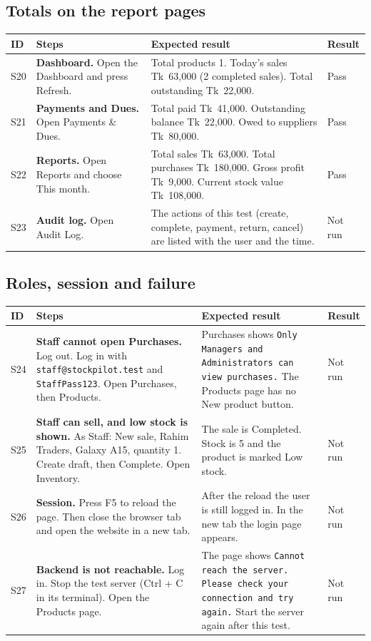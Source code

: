 \documentclass[11pt,a4paper]{article}
\newcommand{\code}[1]{\texttt{#1}}
\begin{document}
\subsection{Totals on the report pages}
\begin{longtable}{@{}P{0.75cm}P{6.0cm}P{5.3cm}P{1.3cm}@{}}
\toprule
\textbf{ID} & \textbf{Steps} & \textbf{Expected result} & \textbf{Result} \\
\midrule
\endhead
S20 & \textbf{Dashboard.} Open the Dashboard and press Refresh. & Total products 1. Today's sales Tk~63,000 (2 completed sales). Total outstanding Tk~22,000. & Pass \\\addlinespace
S21 & \textbf{Payments and Dues.} Open Payments \& Dues. & Total paid Tk~41,000. Outstanding balance Tk~22,000. Owed to suppliers Tk~80,000. & Pass \\\addlinespace
S22 & \textbf{Reports.} Open Reports and choose This month. & Total sales Tk~63,000. Total purchases Tk~180,000. Gross profit Tk~9,000. Current stock value Tk~108,000. & Pass \\\addlinespace
S23 & \textbf{Audit log.} Open Audit Log. & The actions of this test (create, complete, payment, return, cancel) are listed with the user and the time. & Not run \\*
\bottomrule
\end{longtable}

\subsection{Roles, session and failure}
\begin{longtable}{@{}P{0.75cm}P{6.0cm}P{5.3cm}P{1.3cm}@{}}
\toprule
\textbf{ID} & \textbf{Steps} & \textbf{Expected result} & \textbf{Result} \\
\midrule
\endhead
S24 & \textbf{Staff cannot open Purchases.} Log out. Log in with \code{staff@stockpilot.test} and \code{StaffPass123}. Open Purchases, then Products. & Purchases shows \code{Only Managers and Administrators can view purchases.} The Products page has no New product button. & Not run \\\addlinespace
S25 & \textbf{Staff can sell, and low stock is shown.} As Staff: New sale, Rahim Traders, Galaxy A15, quantity 1. Create draft, then Complete. Open Inventory. & The sale is Completed. Stock is 5 and the product is marked Low stock. & Not run \\\addlinespace
S26 & \textbf{Session.} Press F5 to reload the page. Then close the browser tab and open the website in a new tab. & After the reload the user is still logged in. In the new tab the login page appears. & Not run \\\addlinespace
S27 & \textbf{Backend is not reachable.} Log in. Stop the test server (Ctrl + C in its terminal). Open the Products page. & The page shows \code{Cannot reach the server. Please check your connection and try again.} Start the server again after this test. & Not run \\*
\bottomrule
\end{longtable}
\end{document}

